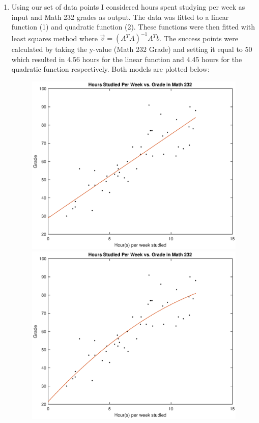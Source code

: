 \documentclass[10pt]{article}
\begin{document}
\noindent{}
\normalsize
\begin{enumerate}[leftmargin=\labelsep]
    
    \item Using our set of data points I considered hours spent studying per week as input and Math 232 grades as output. The data was fitted
    to a linear function (1) and quadratic function (2). These functions were then fitted with least squares method where $\vec{v} = {(A^{T}A)}^{-1}A^{T}b$.
    The success points were calculated by taking the y-value (Math 232 Grade) and setting it equal to 50 which resulted in 4.56 hours for the linear function
    and 4.45 hours for the quadratic function respectively. Both models are plotted below:

    \begin{figure}[h]
        \begin{minipage}[c]{0.48\linewidth}
        \includegraphics[width=\linewidth]{Linear.eps}
        \end{minipage}
        \hfill
        \begin{minipage}[c]{0.48\linewidth}
        \includegraphics[width=\linewidth]{Quadratic.eps}

\end{minipage}
\end{figure}
\end{enumerate}
\end{document}
